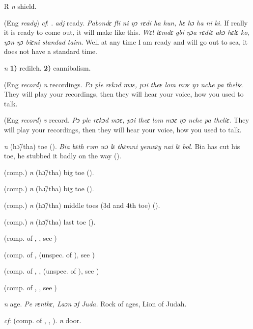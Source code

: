 \begin{letter}{R}
 \textit{n} shield.

 (Eng \textit{ready}) \textit{cf}: . \textit{adj} ready. \textit{Pabondɛ fli ni ŋɔ rɛdi ha hun, hɛ hɔ ha ni ki.} If really it is ready to come out, it will make like this. \textit{Wɛl tɛmdɛ gbi ŋɔa rɛdiɛ akɔ hɛlɛ ko, ŋɔn ŋɔ biɛni standad taim.} Well at any time I am ready and will go out to sea, it does not have a standard time.

 \textit{n} \textbf{1)} redileh. \textbf{2)} cannibalism.

 (Eng \textit{record}) \textit{n} recordings. \textit{Pɔ ple rɛkɔd mɔɛ, pɔi theɛ lom mɔɛ ŋɔ nche pa theliɛ.} They will play your recordings, then they will hear your voice, how you used to talk.

 (Eng \textit{record}) \textit{v} record. \textit{Pɔ ple rɛkɔd mɔɛ, pɔi theɛ lom mɔɛ ŋɔ nche pa theliɛ.} They will play your recordings, then they will hear your voice, how you used to talk. 

 \textit{n} (hɔ̃/tha) toe (\citealt{Pichl1967}). \textit{Bia bɛth rəm wɔ lɛ thɛmni yenwɛy nai lɛ bol.} Bia has cut his toe, he stubbed it badly on the way (\citealt{Pichl1967}). 

 (comp.) \textit{n} (hɔ̃/tha) big toe (\citealt{Pichl1967}).

 (comp.) \textit{n} (hɔ̃/tha) big toe (\citealt{Pichl1967}).

 (comp.) \textit{n} (hɔ̃/tha) middle toes (3d and 4th toe) (\citealt{Pichl1967}).

 (comp.) \textit{n} (hɔ̃/tha) last toe (\citealt{Pichl1967}).

 (comp. of , , see ) 

 (comp. of ,  (unspec. of ), see ) 

 (comp. of , ,  (unspec. of ), see ) 

 (comp. of , , see ) 

 \textit{n} age. \textit{Pe rɛnthɛ, Laɔn ɔf Juda.} Rock of ages, Lion of Judah.

 \textit{cf}:  (comp. of , , ). \textit{n} door.


\end{letter}
